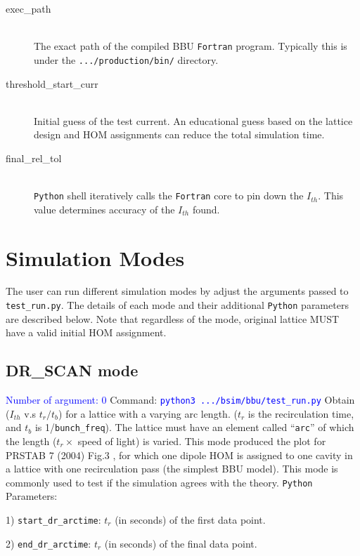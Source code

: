 \documentclass{hitec}
\newcommand{\Newline}{\hfil \\}
\begin{document}
\begin{description}
\item[exec_path] \Newline
The exact path of the compiled BBU \texttt{Fortran} program. Typically this is under the \texttt{.../production/bin/} directory. 
%
\item[threshold_start_curr] \Newline
Initial guess of the test current. An educational guess based on the lattice design and HOM assignments can reduce the total simulation time. 
%
\item[final_rel_tol] \Newline
\texttt{Python} shell iteratively calls the  \texttt{Fortran} core to pin down the $I_{th}$. This value determines accuracy of the $I_{th}$ found.
\end{description}

\section{Simulation Modes}
The user can run different simulation modes by adjust the arguments passed to  \texttt{test_run.py}. The details of each mode and their additional \texttt{Python} parameters are described below. Note that regardless of the mode, original lattice MUST have a valid initial HOM assignment. 

\subsection{DR_SCAN mode}
\textcolor{blue}{Number of argument: 0}
\bigbreak
Command: \textcolor{blue}{\texttt{python3   .../bsim/bbu/test_run.py}} 
\bigbreak
Obtain ($I_{th}$ v.s $t_r/t_b$) for a lattice with a varying arc length. ($t_r$ is the recirculation time, and $t_b$ is 1/\texttt{bunch_freq}). The lattice must have an element called ``\texttt{arc}'' of which the length ($t_r \times$ speed of light) is varied.
This mode produced the plot for PRSTAB 7 (2004) Fig.3 \cite{GeorgBBU}, for which one dipole HOM is assigned to one cavity in a lattice with one recirculation pass (the simplest BBU model).
This mode is commonly used to test if the simulation agrees with the theory.
\bigbreak
\texttt{Python} Parameters:

1) \texttt{start_dr_arctime}: $t_r$ (in seconds) of the first data point.

2) \texttt{end_dr_arctime}: $t_r$ (in seconds) of the final data point.
\end{document}

